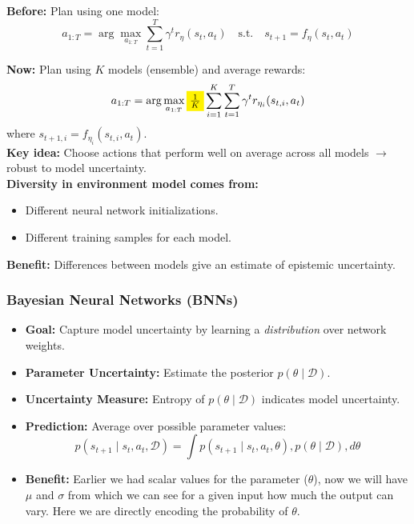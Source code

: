 \documentclass[12pt]{article}
\begin{document}
\textbf{Before:} Plan using one model:
$$
a_{1:T} = \arg\max_{a_{1:T}} \sum_{t=1}^T \gamma^t r_\eta(s_t,a_t) \quad \text{s.t.} \quad s_{t+1} = f_\eta(s_t,a_t)
$$

\textbf{Now:} Plan using $K$ models (ensemble) and average rewards:
$$
a_{1:T} = \arg\max_{a_{1:T}} \colorbox{yellow}{$\frac{1}{K}$} \sum_{i=1}^K \sum_{t=1}^T \gamma^t r_{\eta_i}(s_{t,i},a_t)
$$
where $s_{t+1,i} = f_{\eta_i}(s_{t,i},a_t)$.\\

\textbf{Key idea:} Choose actions that perform well on average across all models $\rightarrow$ robust to model uncertainty.\\

\textbf{Diversity in environment model comes from:}
\begin{itemize}
    \item Different neural network initializations.
    \item Different training samples for each model.
\end{itemize}

\textbf{Benefit:} Differences between models give an estimate of epistemic uncertainty.

\subsubsection{Bayesian Neural Networks (BNNs)}
\begin{itemize}
\item \textbf{Goal:} Capture model uncertainty by learning a \textit{distribution} over network weights.
\item \textbf{Parameter Uncertainty:} Estimate the posterior $p(\theta \mid \mathcal{D})$.
\item \textbf{Uncertainty Measure:} Entropy of $p(\theta \mid \mathcal{D})$ indicates model uncertainty.
\item \textbf{Prediction:} Average over possible parameter values:
\begin{equation*}
p(s_{t+1} \mid s_t, a_t, \mathcal{D}) = \int p(s_{t+1} \mid s_t, a_t, \theta) , p(\theta \mid \mathcal{D}) , d\theta
\end{equation*}
\item \textbf{Benefit:} Earlier we had scalar values for the parameter ($\theta$), now we will have $\mu$ and $\sigma$ from which we can see for a given input how much the output can vary. Here we are directly encoding the probability of $\theta$.
\end{itemize}
\end{document}
